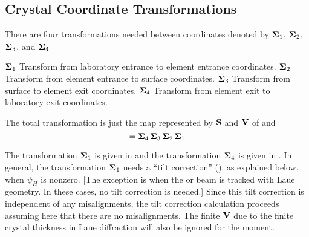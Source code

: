 \subsection{Crystal Coordinate Transformations}
\label{s:crystal.trans}

There are four transformations needed between coordinates
denoted by ${\bf \Sigma}_1$, ${\bf \Sigma}_2$, ${\bf \Sigma}_3$, and ${\bf \Sigma}_4$
\begin{example}
  \({\bf \Sigma}_1\)  Transform from laboratory entrance to element entrance coordinates.  
  \({\bf \Sigma}_2\)  Transform from element entrance to surface coordinates.  
  \({\bf \Sigma}_3\)  Transform from surface to element exit coordinates.  
  \({\bf \Sigma}_4\)  Transform from element exit to laboratory exit coordinates.  
\end{example}
The total transformation is just the map represented by ${\bf S}$ and
${\bf V}$ of  and 
\begin{equation}
  [\bfS, \bfV] = \Bf\Sigma_4 \, \Bf\Sigma_3 \, \Bf\Sigma_2 \, \Bf\Sigma_1
\end{equation}

The transformation ${\bf \Sigma}_1$ is given in
 and the transformation ${\bf \Sigma}_4$ is
given in . In general, the transformation
${\bf \Sigma}_1$ needs a ``tilt correction'' (), as explained
below, when $\psi_H$ is nonzero.  [The exception is when the
 or  beam is tracked with Laue
geometry. In these cases, no tilt correction is needed.] Since this
tilt correction is independent of any misalignments, the tilt
correction calculation proceeds assuming here that there are no
misalignments. The finite ${\bf V}$ due to the finite crystal thickness
in Laue diffraction will also be ignored for the moment.

